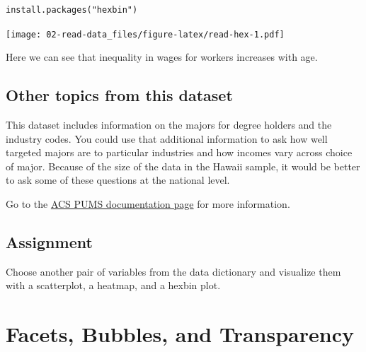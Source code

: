\documentclass[]{book}
\newenvironment{Shaded}{\begin{snugshade}}{\end{snugshade}}
\newcommand{\KeywordTok}[1]{\textcolor[rgb]{0.13,0.29,0.53}{\textbf{{#1}}}}
\newcommand{\DecValTok}[1]{\textcolor[rgb]{0.00,0.00,0.81}{{#1}}}
\newcommand{\StringTok}[1]{\textcolor[rgb]{0.31,0.60,0.02}{{#1}}}
\newcommand{\NormalTok}[1]{{#1}}
\theoremstyle{definition}
\theoremstyle{definition}
\theoremstyle{remark}
\begin{document}
\begin{verbatim}
install.packages("hexbin")
\end{verbatim}

\begin{Shaded}
\end{Shaded}

\texttt{[image: 02-read-data\_files/figure-latex/read-hex-1.pdf]}

Here we can see that inequality in wages for workers increases with age.

\section{Other topics from this
dataset}\label{other-topics-from-this-dataset}

This dataset includes information on the majors for degree holders and
the industry codes. You could use that additional information to ask how
well targeted majors are to particular industries and how incomes vary
across choice of major. Because of the size of the data in the Hawaii
sample, it would be better to ask some of these questions at the
national level.

Go to the
\href{https://www.census.gov/programs-surveys/acs/technical-documentation/pums/documentation.2015.html}{ACS
PUMS documentation page} for more information.

\section{Assignment}\label{assignment-1}

Choose another pair of variables from the data dictionary and visualize
them with a scatterplot, a heatmap, and a hexbin plot.

\hypertarget{facets-and-bubbles}{\chapter{Facets, Bubbles, and
Transparency}\label{facets-and-bubbles}}
\end{document}
